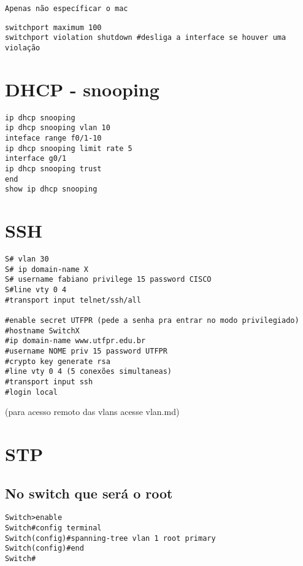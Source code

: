 \documentclass[]{article}
\begin{document}
\begin{verbatim}
Apenas não específicar o mac
\end{verbatim}

\begin{verbatim}
switchport maximum 100 
switchport violation shutdown #desliga a interface se houver uma violação
\end{verbatim}

\section{DHCP - snooping}\label{dhcp---snooping}

\begin{verbatim}
ip dhcp snooping
ip dhcp snooping vlan 10
inteface range f0/1-10
ip dhcp snooping limit rate 5
interface g0/1
ip dhcp snooping trust
end
show ip dhcp snooping
\end{verbatim}

\section{SSH}\label{ssh}

\begin{verbatim}
S# vlan 30 
S# ip domain-name X 
S# username fabiano privilege 15 password CISCO
S#line vty 0 4
#transport input telnet/ssh/all 

#enable secret UTFPR (pede a senha pra entrar no modo privilegiado) 
#hostname SwitchX 
#ip domain-name www.utfpr.edu.br 
#username NOME priv 15 password UTFPR 
#crypto key generate rsa 
#line vty 0 4 (5 conexões simultaneas) 
#transport input ssh 
#login local 
\end{verbatim}

(para acesso remoto das vlans acesse vlan.md)

\section{STP}\label{stp}

\subsection{No switch que será o
root}\label{no-switch-que-seruxe1-o-root}

\begin{verbatim}
Switch>enable
Switch#config terminal
Switch(config)#spanning-tree vlan 1 root primary
Switch(config)#end
Switch#
\end{verbatim}
\end{document}
